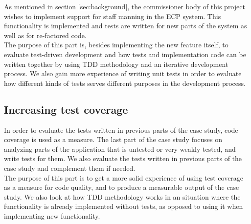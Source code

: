 As mentioned in section \ref{sec:background}, the commissioner body of
this project wishes to implement support for staff manning in the ECP
system. This functionality is implemented and tests are written for
new parts of the system as well as for re-factored code.\\

The purpose of this part is, besides implementing the new feature
itself, to evaluate test-driven development and how tests and
implementation code can be written together by using TDD methodology and
an iterative development process. We also gain more experience of
writing unit tests in order to evaluate how different kinds of tests
serves different purposes in the development process.\\


\subsection{Increasing test coverage}

In order to evaluate the tests written in previous parts of the case
study, code coverage is used as a measure. The last part of the case
study focuses on analyzing parts of the application that is untested or
very weakly tested, and write tests for them. We also evaluate the tests
written in previous parts of the case study and complement them if
needed.\\

The purpose of this part is to get a more solid experience of using test
coverage as a measure for code quality, and to produce a measurable
output of the case study. We also look at how TDD methodology works in
an situation where the functionality is already implemented without
tests, as opposed to using it when implementing new functionality.\\
